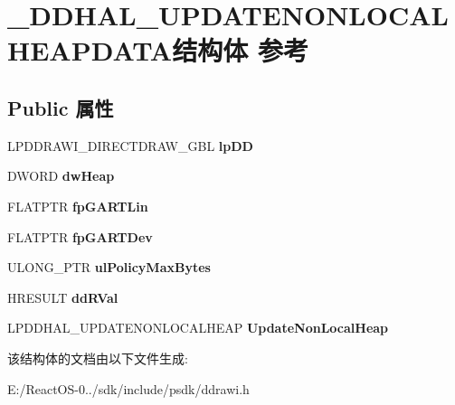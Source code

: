 \hypertarget{struct___d_d_h_a_l___u_p_d_a_t_e_n_o_n_l_o_c_a_l_h_e_a_p_d_a_t_a}{}\section{\+\_\+\+D\+D\+H\+A\+L\+\_\+\+U\+P\+D\+A\+T\+E\+N\+O\+N\+L\+O\+C\+A\+L\+H\+E\+A\+P\+D\+A\+T\+A结构体 参考}
\label{struct___d_d_h_a_l___u_p_d_a_t_e_n_o_n_l_o_c_a_l_h_e_a_p_d_a_t_a}
\subsection*{Public 属性}
\begin{DoxyCompactItemize}
\item 
\mbox{\label{struct___d_d_h_a_l___u_p_d_a_t_e_n_o_n_l_o_c_a_l_h_e_a_p_d_a_t_a_a298ada0c841f1fc79d374feb2adf7ae5}} 
L\+P\+D\+D\+R\+A\+W\+I\+\_\+\+D\+I\+R\+E\+C\+T\+D\+R\+A\+W\+\_\+\+G\+BL {\bfseries lp\+DD}
\item 
\mbox{\label{struct___d_d_h_a_l___u_p_d_a_t_e_n_o_n_l_o_c_a_l_h_e_a_p_d_a_t_a_a6da1ed55024d1f6a2d09c3c93abb8a63}} 
D\+W\+O\+RD {\bfseries dw\+Heap}
\item 
\mbox{\label{struct___d_d_h_a_l___u_p_d_a_t_e_n_o_n_l_o_c_a_l_h_e_a_p_d_a_t_a_a19adceb278c434e6edb2c83b34ef5e78}} 
F\+L\+A\+T\+P\+TR {\bfseries fp\+G\+A\+R\+T\+Lin}
\item 
\mbox{\label{struct___d_d_h_a_l___u_p_d_a_t_e_n_o_n_l_o_c_a_l_h_e_a_p_d_a_t_a_aac2e31b416810efe12ef32fc7c2302c8}} 
F\+L\+A\+T\+P\+TR {\bfseries fp\+G\+A\+R\+T\+Dev}
\item 
\mbox{\label{struct___d_d_h_a_l___u_p_d_a_t_e_n_o_n_l_o_c_a_l_h_e_a_p_d_a_t_a_ac230ab2a03032fe54e6d7149d7ca3819}} 
U\+L\+O\+N\+G\+\_\+\+P\+TR {\bfseries ul\+Policy\+Max\+Bytes}
\item 
\mbox{\label{struct___d_d_h_a_l___u_p_d_a_t_e_n_o_n_l_o_c_a_l_h_e_a_p_d_a_t_a_a1c0d8a31497373735e1ed3c6d52086b0}} 
H\+R\+E\+S\+U\+LT {\bfseries dd\+R\+Val}
\item 
\mbox{\label{struct___d_d_h_a_l___u_p_d_a_t_e_n_o_n_l_o_c_a_l_h_e_a_p_d_a_t_a_af2068869c8d71e322656ab276a632228}} 
L\+P\+D\+D\+H\+A\+L\+\_\+\+U\+P\+D\+A\+T\+E\+N\+O\+N\+L\+O\+C\+A\+L\+H\+E\+AP {\bfseries Update\+Non\+Local\+Heap}
\end{DoxyCompactItemize}


该结构体的文档由以下文件生成\+:\begin{DoxyCompactItemize}
\item 
E\+:/\+React\+O\+S-\/0../sdk/include/psdk/ddrawi.\+h\end{DoxyCompactItemize}
